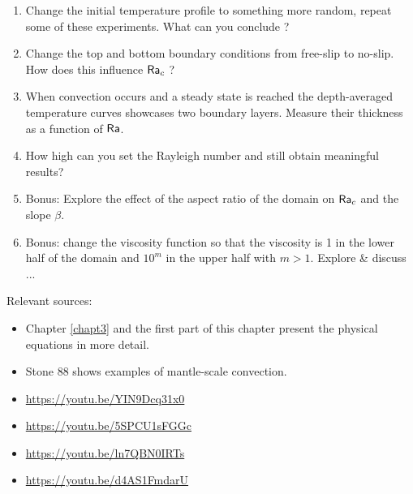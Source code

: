 \begin{enumerate}
\item Change the initial temperature profile to something more random, repeat some of these experiments. 
What can you conclude ?

\item Change the top and bottom boundary conditions from free-slip to no-slip. How 
does this influence ${\mathsf{Ra}}_c$ ?

\item When convection occurs and a steady state is reached the depth-averaged temperature
curves showcases two boundary layers. Measure their thickness as a function of ${\mathsf{Ra}}$.

\item How high can you set the Rayleigh number and still obtain meaningful results?

\item Bonus: Explore the effect of the aspect ratio of the domain on ${\mathsf{Ra}}_c$ and the slope $\beta$.

\item Bonus: change the viscosity function so that the viscosity is 1 in the lower half of the domain 
and $10^m$ in the upper half with $m>1$. Explore \& discuss ...


\end{enumerate}


\vspace{2cm}

Relevant sources:
\begin{itemize}
\item Chapter \ref{chapt3} and the first part of this chapter present the physical equations in more detail. 
\item Stone 88 shows examples of mantle-scale convection.
\item \url{https://youtu.be/YIN9Dcq31x0}
\item \url{https://youtu.be/5SPCU1sFGGc}
\item \url{https://youtu.be/ln7QBN0IRTs}
\item \url{https://youtu.be/d4AS1FmdarU}
\end{itemize} 



